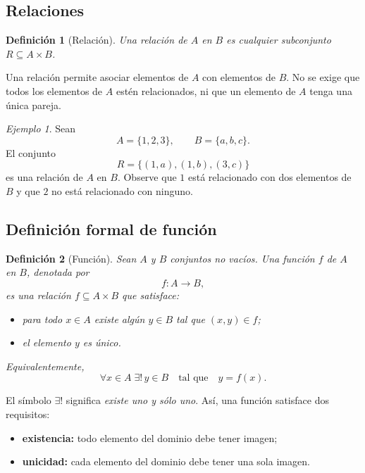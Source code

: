 \documentclass[12pt]{article}
\newtheorem{definicion}{Definición}[section]
\theoremstyle{remark}
\newtheorem{ejemplo}{Ejemplo}[section]
\begin{document}
\subsection*{Relaciones}
\begin{definicion}[Relación]
Una relación de $A$ en $B$ es cualquier subconjunto $R\subseteq A\times B$.
\end{definicion}

Una relación permite asociar elementos de $A$ con elementos de $B$. No se
exige que todos los elementos de $A$ estén relacionados, ni que un elemento de $A$ tenga una única pareja.

\begin{ejemplo}
Sean
\[
A=\{1,2,3\},\qquad B=\{a,b,c\}.
\]
El conjunto
\[
R=\{(1,a),(1,b),(3,c)\}
\]
es una relación de $A$ en $B$. Observe que $1$ está relacionado con dos
elementos de $B$ y que $2$ no está relacionado con ninguno.
\end{ejemplo}

\subsection*{Definición formal de función}
\begin{definicion}[Función]
Sean $A$ y $B$ conjuntos no vacíos. Una \emph{función} $f$ de $A$ en $B$,
denotada por
\[
f:A\longrightarrow B,
\]
es una relación $f\subseteq A\times B$ que satisface:

\begin{itemize}
    \item para todo $x\in A$ existe algún $y\in B$ tal que $(x,y)\in f$;
    \item el elemento $y$ es único.
\end{itemize}

Equivalentemente,
\[
\forall x\in A\;\exists!\,y\in B
\quad\text{tal que}\quad y=f(x).
\]
\end{definicion}

El símbolo $\exists!$ significa \textit{existe uno y sólo uno}. Así, una función satisface dos requisitos:

\begin{itemize}
    \item \textbf{existencia:} todo elemento del dominio debe tener imagen;
    \item \textbf{unicidad:} cada elemento del dominio debe tener una sola imagen.
\end{itemize}
\end{document}
